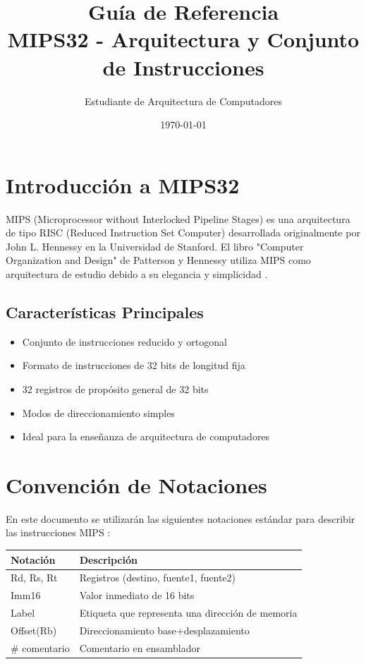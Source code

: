 \documentclass[12pt]{article}
\title{\textbf{Guía de Referencia}\\MIPS32 - Arquitectura y Conjunto de Instrucciones}
\author{Estudiante de Arquitectura de Computadores}
\date{\today}
\begin{document}
\maketitle

\tableofcontents
\newpage

\section{Introducción a MIPS32}

MIPS (Microprocessor without Interlocked Pipeline Stages) es una arquitectura de tipo RISC (Reduced Instruction Set Computer) desarrollada originalmente por John L. Hennessy en la Universidad de Stanford. El libro "Computer Organization and Design" de Patterson y Hennessy utiliza MIPS como arquitectura de estudio debido a su elegancia y simplicidad \cite{hennessy2012computer}.

\subsection{Características Principales}
\begin{itemize}
    \item Conjunto de instrucciones reducido y ortogonal
    \item Formato de instrucciones de 32 bits de longitud fija
    \item 32 registros de propósito general de 32 bits
    \item Modos de direccionamiento simples
    \item Ideal para la enseñanza de arquitectura de computadores
\end{itemize}

\section{Convención de Notaciones}

En este documento se utilizarán las siguientes notaciones estándar para describir las instrucciones MIPS \cite{mipsguide}:

\begin{center}
    \begin{tabularx}{0.8\textwidth}{|l|X|}
        \hline
        \textbf{Notación} & \textbf{Descripción} \\
        \hline
        Rd, Rs, Rt & Registros (destino, fuente1, fuente2) \\
        \hline
        Imm16 & Valor inmediato de 16 bits \\
        \hline
        Label & Etiqueta que representa una dirección de memoria \\
        \hline
        Offset(Rb) & Direccionamiento base+desplazamiento \\
        \hline
        \# comentario & Comentario en ensamblador \\
        \hline
    \end{tabularx}
\end{center}
\end{document}
